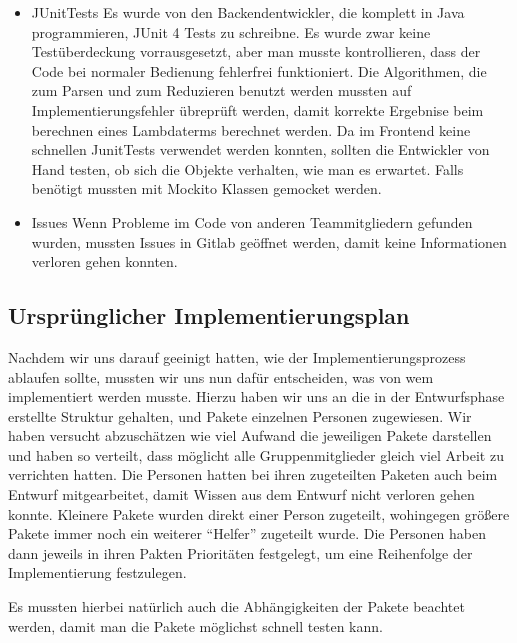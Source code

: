 \documentclass[parskip=full,11pt,twoside]{scrartcl}
\begin{document}
\begin{itemize}
       \item JUnitTests
       \newline
      	Es wurde von den Backendentwickler, die komplett in Java programmieren, JUnit 4 Tests zu schreibne. 
      	Es wurde zwar keine Testüberdeckung vorrausgesetzt, aber man musste kontrollieren, dass der Code bei normaler Bedienung fehlerfrei funktioniert.
      	 Die Algorithmen, die zum Parsen und zum Reduzieren benutzt werden mussten auf Implementierungsfehler übreprüft werden, damit korrekte Ergebnise beim berechnen eines Lambdaterms berechnet werden.
      	Da im Frontend keine schnellen JunitTests verwendet werden konnten, sollten die Entwickler von Hand testen, ob sich die Objekte verhalten, wie man es erwartet. 
      	Falls benötigt mussten mit Mockito Klassen gemocket werden.
      	\item Issues
      	Wenn Probleme im Code von anderen Teammitgliedern gefunden wurden, mussten Issues in Gitlab geöffnet werden, damit keine Informationen verloren gehen konnten.
      	\end{itemize}

\subsection{Ursprünglicher Implementierungsplan}
Nachdem wir uns darauf geeinigt hatten, wie der Implementierungsprozess ablaufen sollte, mussten wir uns nun dafür entscheiden, was von wem implementiert werden musste.
Hierzu haben wir uns an die in der Entwurfsphase erstellte Struktur gehalten, und Pakete einzelnen Personen zugewiesen.
Wir haben versucht abzuschätzen wie viel Aufwand die jeweiligen Pakete darstellen und haben so verteilt, dass möglicht alle Gruppenmitglieder gleich viel Arbeit zu verrichten hatten.
Die Personen hatten bei ihren zugeteilten Paketen auch beim Entwurf mitgearbeitet, damit Wissen aus dem Entwurf nicht verloren gehen konnte.
Kleinere Pakete wurden direkt einer Person zugeteilt, wohingegen größere Pakete immer noch ein weiterer \enquote{Helfer} zugeteilt wurde. 
Die Personen haben dann jeweils in ihren Pakten Prioritäten festgelegt, um eine Reihenfolge der Implementierung festzulegen. 

Es mussten hierbei natürlich auch die Abhängigkeiten der Pakete beachtet werden, damit man die Pakete möglichst schnell testen kann.
\end{document}
